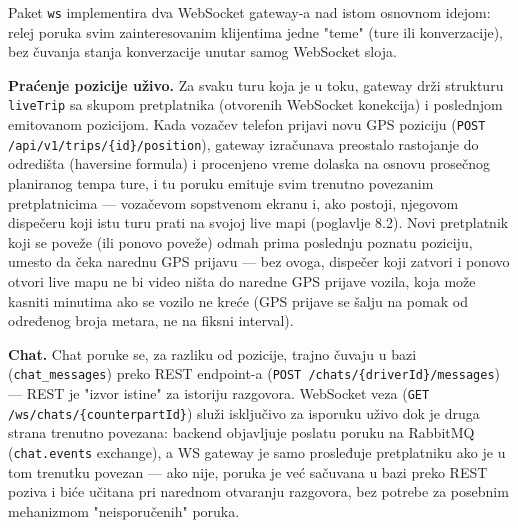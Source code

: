 Paket \texttt{ws} implementira dva WebSocket gateway-a nad istom osnovnom idejom: relej poruka svim zainteresovanim klijentima jedne "teme" (ture ili konverzacije), bez čuvanja stanja konverzacije unutar samog WebSocket sloja.

\textbf{Praćenje pozicije uživo.} Za svaku turu koja je u toku, gateway drži strukturu \texttt{liveTrip} sa skupom pretplatnika (otvorenih WebSocket konekcija) i poslednjom emitovanom pozicijom. Kada vozačev telefon prijavi novu GPS poziciju (\texttt{POST /api/v1/trips/\{id\}/position}), gateway izračunava preostalo rastojanje do odredišta (haversine formula) i procenjeno vreme dolaska na osnovu prosečnog planiranog tempa ture, i tu poruku emituje svim trenutno povezanim pretplatnicima — vozačevom sopstvenom ekranu i, ako postoji, njegovom dispečeru koji istu turu prati na svojoj live mapi (poglavlje 8.2). Novi pretplatnik koji se poveže (ili ponovo poveže) odmah prima poslednju poznatu poziciju, umesto da čeka narednu GPS prijavu — bez ovoga, dispečer koji zatvori i ponovo otvori live mapu ne bi video ništa do naredne GPS prijave vozila, koja može kasniti minutima ako se vozilo ne kreće (GPS prijave se šalju na pomak od određenog broja metara, ne na fiksni interval).

\textbf{Chat.} Chat poruke se, za razliku od pozicije, trajno čuvaju u bazi (\texttt{chat\_messages}) preko REST endpoint-a (\texttt{POST /chats/\{driverId\}/messages}) — REST je "izvor istine" za istoriju razgovora. WebSocket veza (\texttt{GET /ws/chats/\{counterpartId\}}) služi isključivo za isporuku uživo dok je druga strana trenutno povezana: backend objavljuje poslatu poruku na RabbitMQ (\texttt{chat.events} exchange), a WS gateway je samo prosleđuje pretplatniku ako je u tom trenutku povezan — ako nije, poruka je već sačuvana u bazi preko REST poziva i biće učitana pri narednom otvaranju razgovora, bez potrebe za posebnim mehanizmom "neisporučenih" poruka.

\clearpage
